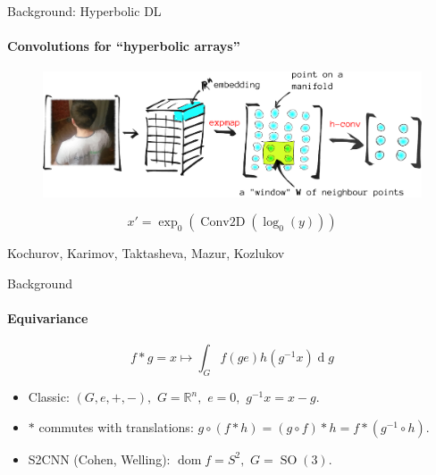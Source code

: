 \documentclass{beamer}
\begin{document}
\begin{frame}{Background: Hyperbolic DL}
    \framesubtitle{Convolutions for ``hyperbolic arrays''}\centering

    \begin{figure}\centering
        \includegraphics[width=\linewidth]{art/image-convolutions-2019.pdf}
    \end{figure}

        \[ x' = \exp_0\left(
            \operatorname{Conv2D}\left(
                \log_0(y)
                \right)\right) \]

        Kochurov, Karimov, Taktasheva, Mazur, Kozlukov
\end{frame}

\begin{frame}{Background}
    \framesubtitle{Equivariance}

    \[
        f \mathbin{*} g = x \mapsto \int_G f(g e) h(g^{-1} x) \operatorname{d}g
    \]

    \begin{itemize}
        \item Classic: \( (G, e, +, -), \) \( G=\mathbb{R}^n, \) \( e=0, \)
            \( g^{-1}x = x - g. \)
        \item \( * \) commutes with translations:
            \( g\circ (f \mathbin{*} h)
            = (g \circ f) \mathbin{*} h
            = f \mathbin{*} (g^{-1} \circ h). \)
        \item S2CNN (Cohen, Welling): \( \operatorname{dom}f = S^2, \)
            \( G = \operatorname{SO}(3) \).
    \end{itemize}
\end{frame}
\end{document}
